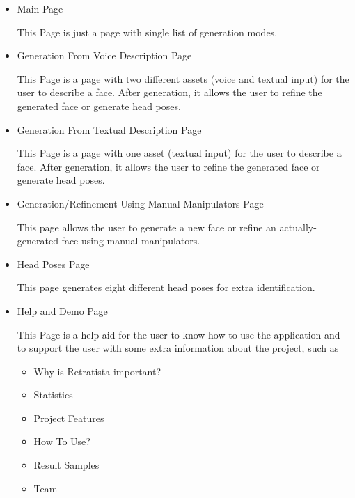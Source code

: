 \begin{itemize}
    \item Main Page
    
    This Page is just a page with single list of generation modes.



    \item Generation From Voice Description Page
    
    This Page is a page with two different assets (voice and textual input) for the user to describe a face. After generation, it allows the user to refine the generated face or generate head poses.
    
    
    
    \item Generation From Textual Description Page
    
    This Page is a page with one asset (textual input) for the user to describe a face. After generation, it allows the user to refine the generated face or generate head poses.
    
    
    
    
    \item Generation/Refinement Using Manual Manipulators Page
    
    This page allows the user to generate a new face or refine an actually-generated face using manual manipulators.
    



    \item Head Poses Page
    
    This page generates eight different head poses for extra identification.
    
    \item Help and Demo Page 
    
    This Page is a help aid for the user to know how to use the application and to support the user with some extra information about the project, such as
    \begin{itemize}
        \item Why is Retratista important?
        \item Statistics
        \item Project Features
        \item How To Use?
        \item Result Samples
        \item Team
    \end{itemize}
    
\end{itemize}

